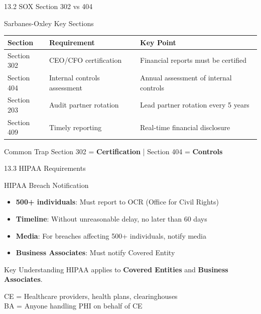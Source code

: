 \documentclass{beamer}
\begin{document}
	\begin{frame}{13.2 SOX Section 302 vs 404}
		\begin{block}{Sarbanes-Oxley Key Sections}
			\begin{tabular}{|p{2.5cm}|p{4cm}|p{4.5cm}|}
				\hline
				\textbf{Section} & \textbf{Requirement} & \textbf{Key Point} \\
				\hline
				Section 302 & CEO/CFO certification & Financial reports must be certified \\
				\hline
				Section 404 & Internal controls assessment & Annual assessment of internal controls \\
				\hline
				Section 203 & Audit partner rotation & Lead partner rotation every 5 years \\
				\hline
				Section 409 & Timely reporting & Real-time financial disclosure \\
				\hline
			\end{tabular}
		\end{block}
		
		\begin{alertblock}{Common Trap}
			Section 302 = \textbf{Certification} | Section 404 = \textbf{Controls}
		\end{alertblock}
	\end{frame}
	
	\begin{frame}{13.3 HIPAA Requirements}
		\begin{block}{HIPAA Breach Notification}
			\begin{itemize}
				\item \textbf{500+ individuals}: Must report to OCR (Office for Civil Rights)
				\item \textbf{Timeline}: Without unreasonable delay, no later than 60 days
				\item \textbf{Media}: For breaches affecting 500+ individuals, notify media
				\item \textbf{Business Associates}: Must notify Covered Entity
			\end{itemize}
		\end{block}
		
		\begin{exampleblock}{Key Understanding}
			HIPAA applies to \textbf{Covered Entities} and \textbf{Business Associates}.
			
			CE = Healthcare providers, health plans, clearinghouses \\
			BA = Anyone handling PHI on behalf of CE
		\end{exampleblock}
	\end{frame}
	
\end{document}

